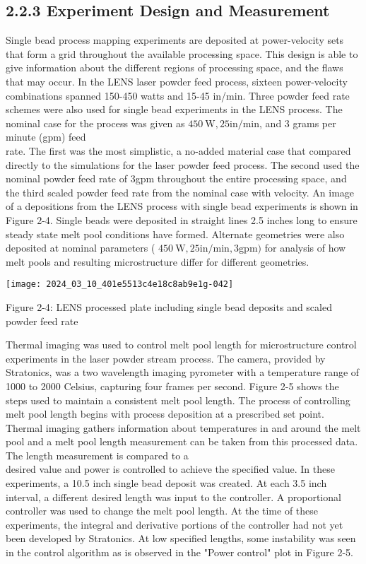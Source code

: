 \documentclass[10pt]{article}
\begin{document}
\subsection*{2.2.3 Experiment Design and Measurement}
Single bead process mapping experiments are deposited at power-velocity sets that form a grid throughout the available processing space. This design is able to give information about the different regions of processing space, and the flaws that may occur. In the LENS laser powder feed process, sixteen power-velocity combinations spanned 150-450 watts and 15-45 in/min. Three powder feed rate schemes were also used for single bead experiments in the LENS process. The nominal case for the process was given as $450 \mathrm{~W}, 25 \mathrm{in} / \mathrm{min}$, and 3 grams per minute (gpm) feed\\
rate. The first was the most simplistic, a no-added material case that compared directly to the simulations for the laser powder feed process. The second used the nominal powder feed rate of 3gpm throughout the entire processing space, and the third scaled powder feed rate from the nominal case with velocity. An image of a depositions from the LENS process with single bead experiments is shown in Figure 2-4. Single beads were deposited in straight lines 2.5 inches long to ensure steady state melt pool conditions have formed. Alternate geometries were also deposited at nominal parameters ( $450 \mathrm{~W}, 25 \mathrm{in} / \mathrm{min}, 3 \mathrm{gpm})$ for analysis of how melt pools and resulting microstructure differ for different geometries.

\begin{center}
\texttt{[image: 2024\_03\_10\_401e5513c4e18c8ab9e1g-042]}
\end{center}

Figure 2-4: LENS processed plate including single bead deposits and scaled powder feed rate

Thermal imaging was used to control melt pool length for microstructure control experiments in the laser powder stream process. The camera, provided by Stratonics, was a two wavelength imaging pyrometer with a temperature range of 1000 to 2000 Celsius, capturing four frames per second. Figure 2-5 shows the steps used to maintain a consistent melt pool length. The process of controlling melt pool length begins with process deposition at a prescribed set point. Thermal imaging gathers information about temperatures in and around the melt pool and a melt pool length measurement can be taken from this processed data. The length measurement is compared to a\\
desired value and power is controlled to achieve the specified value. In these experiments, a 10.5 inch single bead deposit was created. At each 3.5 inch interval, a different desired length was input to the controller. A proportional controller was used to change the melt pool length. At the time of these experiments, the integral and derivative portions of the controller had not yet been developed by Stratonics. At low specified lengths, some instability was seen in the control algorithm as is observed in the "Power control" plot in Figure 2-5.
\end{document}
